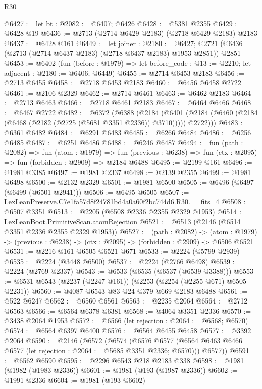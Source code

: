 \begin{lexlean}{R30}
\begin{coremodule}
@6427 := let bt : @2082 := @6407; @6426
@6428 := @5381 @2355
@6429 := @6428 @19
@6436 := @2713 (@2714 @6429 @2183) (@2718 @6429 @2183) @2183
@6437 := @6428 @161
@6449 := let joiner : @2180 := @6427;
  @2721 (@6436 (@2713 (@2714 @6437 @2183) (@2718 @6437 @2183) @1953 @2851)) @2851
@6453 := @6402
    (fun (before : @1979) => let before_code : @13 := @2210; let adjacent : @2180 := @6406; @6449)
@6455 := @2714 @6453 @2183
@6456 := @2713 @6455
@6458 := @2718 @6453 @2183
@6460 := @6456 @6458 @2722
@6461 := @2106 @2329
@6462 := @2714 @6461
@6463 := @6462 @2183
@6464 := @2713 @6463
@6466 := @2718 @6461 @2183
@6467 := @6464 @6466
@6468 := @6467 @2722
@6482 := @6372
    (@6388
      (@2184
        (@6401 (@2184 (@6460 (@2184 (@6468 (@2182 (@2725 (@5681 @3351 @2336)) @3710))))) @2722)))
@6483 := @6361 @6482
@6484 := @6291 @6483
@6485 := @6266 @6484
@6486 := @6256 @6485
@6487 := @6251 @6486
@6488 := @6246 @6487
@6494 := fun (path : @2082) =>
  fun (atom : @1979) =>
  fun (previous : @6238) => fun (ctx : @2095) => fun (forbidden : @2909) => @2184 @6488
@6495 := @2199 @161
@6496 := @1981 @3385
@6497 := @1981 @2337
@6498 := @2139 @2355
@6499 := @1981 @6498
@6500 := @2132 @2329
@6501 := @1981 @6500
@6505 := @6496 (@6497 (@6499 (@6501 @2941)))
@6506 := @6495 @6505
@6507 := LexLeanPreserve.C7e1fa57d8f24781bd4a0a60f2bc744d6.R30.__fits_4
@6508 := @6507 @3351
@6513 := @2205 (@6508 @2336 @2355 @2329 @1953)
@6514 := LexLeanBoot.PrimitiveScan.atomRejection
@6521 := @6513 (@2146 (@6514 @3351 @2336 @2355 @2329 @1953))
@6527 := (path : @2082) ->
  (atom : @1979) -> (previous : @6238) -> (ctx : @2095) -> (forbidden : @2909) -> @6506 @6521
@6531 := @2216 @161 @6505 @6521 @671
@6533 := @2224 (@5799 @2939)
@6535 := @2224 (@3448 @6500)
@6537 := @2224 (@2766 @6498)
@6539 := @2224 (@2769 @2337)
@6543 := @6533 (@6535 (@6537 (@6539 @3388)))
@6553 := @6531 @6543 (@2237 (@2247 @161)) (@2253 (@2254 (@2255 @671) @6505 @2231))
@6560 := @4087 @6543 @83 @24 @379 @669 @2183 @6488
@6561 := @522 @6247
@6562 := @6560 @6561
@6563 := @2235 @2064
@6564 := @2712 @6563
@6566 := @6564 @6378 @6381
@6568 := @4064 @3351 @2336
@6570 := @3438 @2064 @1953
@6572 := @6566 (let rejection : @2064 := @6568; @6570)
@6574 := @6564 @6397 @6400
@6576 := @6564 @6455 @6458
@6577 := @3392 @2064
@6590 := @2146
    (@6572
      (@6574
        (@6576 @6577 (@6564 @6463 @6466 @6577 (let rejection : @2064 := @5685 @3351 @2336; @6570)))
        @6577))
@6591 := @6562 @6590
@6595 := @2296 @6543 @218 @2183 @338
@6598 := @1981 (@1982 (@1983 @2336))
@6601 := @1981 (@193 (@1987 @2336))
@6602 := @1991 @2336
@6604 := @1981 (@193 @6602)

\end{coremodule}
\end{lexlean}
